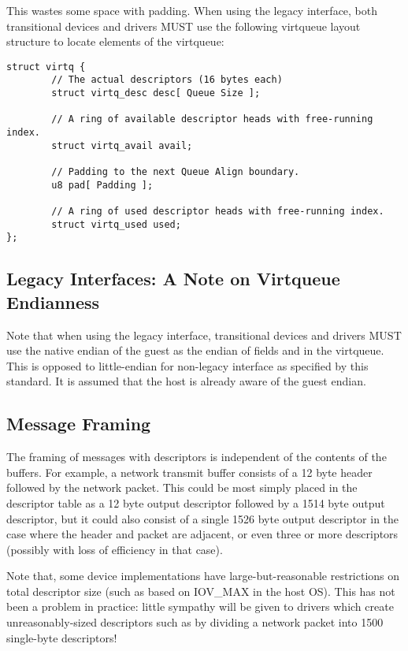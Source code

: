 This wastes some space with padding.
When using the legacy interface, both transitional
devices and drivers MUST use the following virtqueue layout
structure to locate elements of the virtqueue:

\begin{lstlisting}
struct virtq {
        // The actual descriptors (16 bytes each)
        struct virtq_desc desc[ Queue Size ];

        // A ring of available descriptor heads with free-running index.
        struct virtq_avail avail;

        // Padding to the next Queue Align boundary.
        u8 pad[ Padding ];

        // A ring of used descriptor heads with free-running index.
        struct virtq_used used;
};
\end{lstlisting}

\subsection{Legacy Interfaces: A Note on Virtqueue Endianness}\label{sec:Basic Facilities of a Virtio Device / Virtqueues / Legacy Interfaces: A Note on Virtqueue Endianness}

Note that when using the legacy interface, transitional
devices and drivers MUST use the native
endian of the guest as the endian of fields and in the virtqueue.
This is opposed to little-endian for non-legacy interface as
specified by this standard.
It is assumed that the host is already aware of the guest endian.

\subsection{Message Framing}\label{sec:Basic Facilities of a Virtio Device / Virtqueues / Message Framing}
The framing of messages with descriptors is
independent of the contents of the buffers. For example, a network
transmit buffer consists of a 12 byte header followed by the network
packet. This could be most simply placed in the descriptor table as a
12 byte output descriptor followed by a 1514 byte output descriptor,
but it could also consist of a single 1526 byte output descriptor in
the case where the header and packet are adjacent, or even three or
more descriptors (possibly with loss of efficiency in that case).

Note that, some device implementations have large-but-reasonable
restrictions on total descriptor size (such as based on IOV_MAX in the
host OS). This has not been a problem in practice: little sympathy
will be given to drivers which create unreasonably-sized descriptors
such as by dividing a network packet into 1500 single-byte
descriptors!

